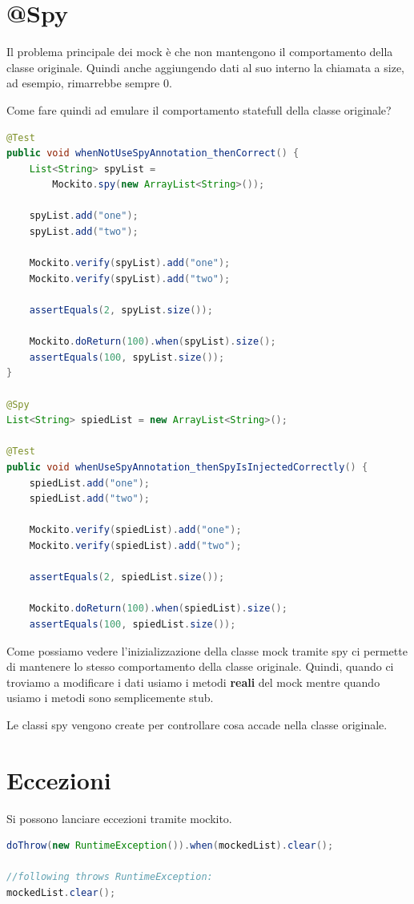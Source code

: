 \documentclass[11pt,a4paper]{book}
\begin{document}
\section{@Spy}
Il problema principale dei mock è che non mantengono il comportamento della classe originale. Quindi anche aggiungendo dati al suo interno la chiamata a size, ad esempio, rimarrebbe sempre 0.

Come fare quindi ad emulare il comportamento statefull della classe originale?

\begin{lstlisting}[language = Java]
@Test
public void whenNotUseSpyAnnotation_thenCorrect() {
    List<String> spyList = 
    	Mockito.spy(new ArrayList<String>());
     
    spyList.add("one");
    spyList.add("two");
 
    Mockito.verify(spyList).add("one");
    Mockito.verify(spyList).add("two");
 
    assertEquals(2, spyList.size());
 
    Mockito.doReturn(100).when(spyList).size();
    assertEquals(100, spyList.size());
}

@Spy
List<String> spiedList = new ArrayList<String>();
 
@Test
public void whenUseSpyAnnotation_thenSpyIsInjectedCorrectly() {
    spiedList.add("one");
    spiedList.add("two");
 
    Mockito.verify(spiedList).add("one");
    Mockito.verify(spiedList).add("two");
 
    assertEquals(2, spiedList.size());
 
    Mockito.doReturn(100).when(spiedList).size();
    assertEquals(100, spiedList.size());
\end{lstlisting}

Come possiamo vedere l'inizializzazione della classe mock tramite spy ci permette di mantenere lo stesso comportamento della classe originale. Quindi, quando ci troviamo a modificare i dati usiamo i metodi \textbf{reali} del mock mentre quando usiamo i metodi sono semplicemente stub.

Le classi spy vengono create per controllare cosa accade nella classe originale.

\section{Eccezioni}
Si possono lanciare eccezioni tramite mockito.
\begin{lstlisting}[language = Java]
doThrow(new RuntimeException()).when(mockedList).clear();

//following throws RuntimeException:
mockedList.clear();
\end{lstlisting}
\end{document}
